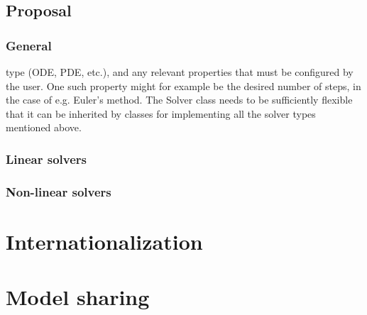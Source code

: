 \documentclass[\rootfolder/main.tex]{subfiles}
\begin{document}
\subsection{Proposal}


\subsubsection{General}

type (ODE, PDE, etc.\@), and any relevant properties that must be configured by the user.
One such property might for example be the desired number of steps, in the case of e.g. Euler's method.
The Solver class needs to be sufficiently flexible that it can be inherited by classes for implementing all the solver types mentioned above.

\subsubsection{Linear solvers}



\subsubsection{Non-linear solvers}

\section{Internationalization}

\section{Model sharing}
\end{document}
